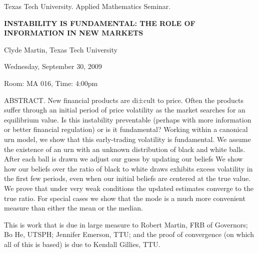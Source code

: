 \documentclass[oneside]{amsart}
\newcommand{\talktitle}{\uppercase{Instability is Fundamental: The Role of Information in New Markets}}
\newcommand{\talkspeaker}{Clyde Martin, Texas Tech University}
\newcommand{\talkdate}{Wednesday, September 30, 2009}
\newcommand{\talkabstract}{New financial products are di±cult to price. Often the products suffer
through an initial period of price volatility as the market searches for an equilibrium value. Is this instability preventable (perhaps with more information or better financial regulation) or is it fundamental? Working within a canonical urn model, we show that this early-trading volatility is fundamental. We assume the existence of an urn with an unknown distribution of black and white balls. After each ball is drawn we adjust our guess by updating our beliefs We show how our beliefs over the ratio of black to white draws exhibits excess volatility in the first few periods, even when our initial beliefs are centered at the true value. We prove that under very weak conditions the updated estimates converge to the true ratio. For special cases we show that the mode is a much more convenient measure than either the mean or the median.

This is work that is due in large measure to Robert Martin, FRB of Governors;
Bo He, UTSPH; Jennifer Emerson, TTU; and the proof of convergence (on which
all of this is based) is due to Kendall Gillies, TTU.

}
\begin{document}
\thispagestyle{empty}

\begin{center}
Texas Tech University.  Applied Mathematics Seminar.

\end{center}

\begin{center}

\textbf{\LARGE \talktitle}

\talkspeaker

\talkdate

Room: MA 016, Time: 4:00pm

\end{center}

ABSTRACT.
\talkabstract
\end{document}
